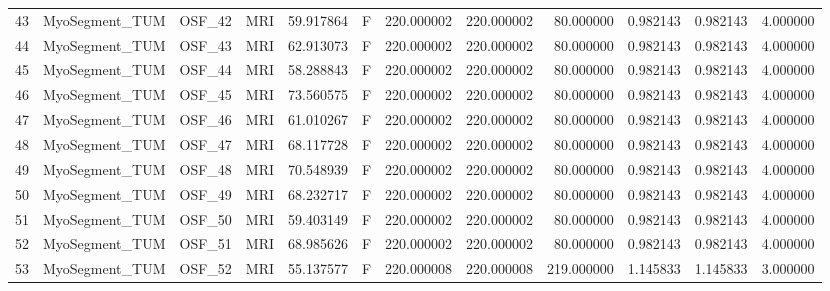 \begin{tabular}{llllrlrrrrrr}
43     &  MyoSegment\_TUM &       OSF\_42 &                MRI &  59.917864 &        F &       220.000002 &    220.000002 &   80.000000 &               0.982143 &            0.982143 &          4.000000 \\
44     &  MyoSegment\_TUM &       OSF\_43 &                MRI &  62.913073 &        F &       220.000002 &    220.000002 &   80.000000 &               0.982143 &            0.982143 &          4.000000 \\
45     &  MyoSegment\_TUM &       OSF\_44 &                MRI &  58.288843 &        F &       220.000002 &    220.000002 &   80.000000 &               0.982143 &            0.982143 &          4.000000 \\
46     &  MyoSegment\_TUM &       OSF\_45 &                MRI &  73.560575 &        F &       220.000002 &    220.000002 &   80.000000 &               0.982143 &            0.982143 &          4.000000 \\
47     &  MyoSegment\_TUM &       OSF\_46 &                MRI &  61.010267 &        F &       220.000002 &    220.000002 &   80.000000 &               0.982143 &            0.982143 &          4.000000 \\
48     &  MyoSegment\_TUM &       OSF\_47 &                MRI &  68.117728 &        F &       220.000002 &    220.000002 &   80.000000 &               0.982143 &            0.982143 &          4.000000 \\
49     &  MyoSegment\_TUM &       OSF\_48 &                MRI &  70.548939 &        F &       220.000002 &    220.000002 &   80.000000 &               0.982143 &            0.982143 &          4.000000 \\
50     &  MyoSegment\_TUM &       OSF\_49 &                MRI &  68.232717 &        F &       220.000002 &    220.000002 &   80.000000 &               0.982143 &            0.982143 &          4.000000 \\
51     &  MyoSegment\_TUM &       OSF\_50 &                MRI &  59.403149 &        F &       220.000002 &    220.000002 &   80.000000 &               0.982143 &            0.982143 &          4.000000 \\
52     &  MyoSegment\_TUM &       OSF\_51 &                MRI &  68.985626 &        F &       220.000002 &    220.000002 &   80.000000 &               0.982143 &            0.982143 &          4.000000 \\
53     &  MyoSegment\_TUM &       OSF\_52 &                MRI &  55.137577 &        F &       220.000008 &    220.000008 &  219.000000 &               1.145833 &            1.145833 &          3.000000 \\

\end{tabular}
